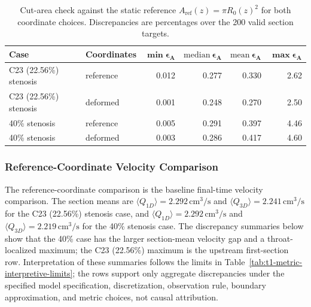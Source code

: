 \begin{table}[!htb]
    \centering
    \scriptsize
    \caption{Cut-area check against the static reference
    $A_{\mathrm{ref}}(z)=\pi R_0(z)^2$ for both coordinate choices.
    Discrepancies are percentages over the 200 valid section targets.}
    \label{tab:t1-area-check}
    \begin{tabular}{@{}llrrrr@{}}
        \toprule
        \textbf{Case}
            & \textbf{Coordinates}
            & $\boldsymbol{\min \epsilon_A}$
            & $\boldsymbol{\mathrm{median}\ \epsilon_A}$
            & $\boldsymbol{\mathrm{mean}\ \epsilon_A}$
            & $\boldsymbol{\max \epsilon_A}$ \\
        \midrule
        C23 (22.56\%) stenosis & reference & 0.012 & 0.277 & 0.330 & 2.62 \\
        C23 (22.56\%) stenosis & deformed & 0.001 & 0.248 & 0.270 & 2.50 \\
        40\% stenosis & reference & 0.005 & 0.291 & 0.397 & 4.46 \\
        40\% stenosis & deformed & 0.003 & 0.286 & 0.417 & 4.60 \\
        \bottomrule
    \end{tabular}
\end{table}

\subsubsection{Reference-Coordinate Velocity Comparison}
\label{subsec:section-mean-velocity-discrepancies}

The reference-coordinate comparison is the baseline final-time
velocity comparison. The section means are
$\langle Q_{1D}\rangle=2.292\,\mathrm{cm}^3/\mathrm{s}$ and
$\langle Q_{3D}\rangle=2.241\,\mathrm{cm}^3/\mathrm{s}$ for the C23 (22.56\%) stenosis
case, and $\langle Q_{1D}\rangle=2.292\,\mathrm{cm}^3/\mathrm{s}$ and
$\langle Q_{3D}\rangle=2.219\,\mathrm{cm}^3/\mathrm{s}$ for the 40\% stenosis
case. The discrepancy summaries below show that the 40\% case has the larger
section-mean velocity gap and a throat-localized maximum; the C23 (22.56\%)
maximum is the upstream first-section row.
Interpretation of these summaries follows the limits in
Table~\ref{tab:t1-metric-interpretive-limits}; the rows support only aggregate
discrepancies under the specified model specification, discretization,
observation rule, boundary approximation, and metric choices, not causal
attribution.

